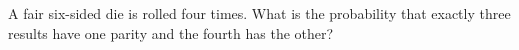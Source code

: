 A fair six-sided die is rolled four times. What is the probability that exactly three results have one parity and the fourth has the other?
